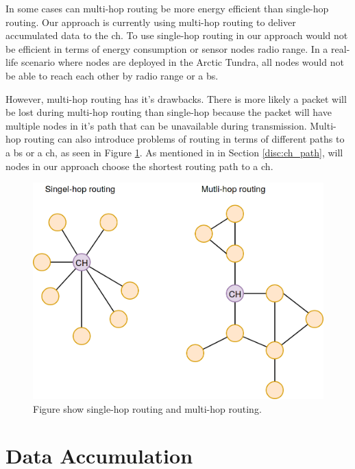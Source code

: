 \documentclass[USenglish]{uit-thesis}
\begin{document}
In some cases can multi-hop routing be more energy efficient than single-hop routing\cite{hopping2}. Our approach is currently using multi-hop routing to deliver accumulated data to the \gls{ch}. To use single-hop routing in our approach would not be efficient in terms of energy consumption or sensor nodes radio range. In a real-life scenario where nodes are deployed in the Arctic Tundra, all nodes would not be able to reach each other by radio range or a \gls{bs}.

However, multi-hop routing has it's drawbacks. There is more likely a packet will be lost during multi-hop routing than single-hop because the packet will have multiple nodes in it's path that can be unavailable during transmission. Multi-hop routing can also introduce problems of routing in terms of different paths to a \gls{bs} or a \gls{ch}, as seen in Figure \ref{fig:hopping}. As mentioned in in Section \ref{disc:ch_path}, will nodes in our approach choose the shortest routing path to a \gls{ch}.

\begin{figure} [ht]
\centering
\includegraphics[scale=0.35]{hopping.png}
\caption{Figure show single-hop routing and multi-hop routing.}
\label{fig:hopping}
\end{figure}


\section{Data Accumulation} \label{disc:data_acc}
\end{document}
